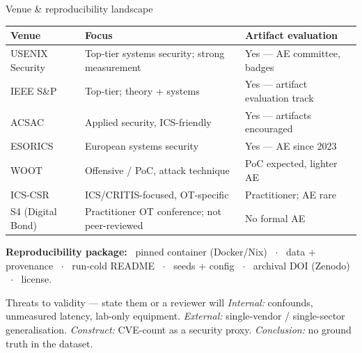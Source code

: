 \documentclass[aspectratio=169,11pt]{beamer}
\begin{document}
\begin{frame}{Venue \& reproducibility landscape}
\centering
\renewcommand{\arraystretch}{1.05}
\tiny
\setlength{\tabcolsep}{3pt}
\begin{tabular}{|p{2.0cm}|p{4.9cm}|p{3.1cm}|}
\hline
\rowcolor{slidePanel}
\textbf{Venue} & \textbf{Focus} & \textbf{Artifact evaluation} \\
\hline
USENIX Security & Top-tier systems security; strong measurement & Yes --- AE committee, badges \\
IEEE S\&P       & Top-tier; theory + systems            & Yes --- artifact evaluation track \\
ACSAC           & Applied security, ICS-friendly        & Yes --- artifacts encouraged \\
ESORICS         & European systems security            & Yes --- AE since 2023 \\
WOOT            & Offensive / PoC, attack technique     & PoC expected, lighter AE \\
ICS-CSR         & ICS/CRITIS-focused, OT-specific       & Practitioner; AE rare \\
S4 (Digital Bond) & Practitioner OT conference; not peer-reviewed & No formal AE \\
\hline
\end{tabular}
\par\vspace{1mm}
{\scriptsize\textbf{Reproducibility package:} \ pinned container (Docker/Nix) \ $\cdot$ \ data + provenance \ $\cdot$ \ run-cold README \ $\cdot$ \ seeds + config \ $\cdot$ \ archival DOI (Zenodo) \ $\cdot$ \ license.}
\par\vspace{0.5mm}
\begin{notebox}{Threats to validity --- state them or a reviewer will}
\emph{Internal:} confounds, unmeasured latency, lab-only equipment. \emph{External:} single-vendor / single-sector generalisation. \emph{Construct:} CVE-count as a security proxy. \emph{Conclusion:} no ground truth in the dataset.
\end{notebox}
\note{
}
\end{frame}
\end{document}
